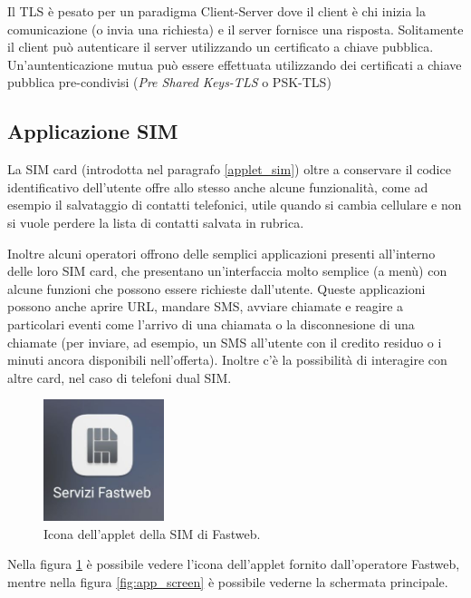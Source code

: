 Il TLS è pesato per un paradigma Client-Server dove il client è chi inizia la comunicazione (o invia una richiesta) e il server fornisce una risposta. Solitamente il client può autenticare il server utilizzando un certificato a chiave pubblica. Un'auntenticazione mutua può essere effettuata utilizzando dei certificati a chiave pubblica pre-condivisi (\textit{Pre Shared Keys-TLS} o PSK-TLS)
\cite{scwebserver}

\subsection{Applicazione SIM}
La SIM card (introdotta nel paragrafo \ref{applet_sim}) oltre a conservare il codice identificativo dell'utente offre allo stesso anche alcune funzionalità, come ad esempio il salvataggio di contatti telefonici, utile quando si cambia cellulare e non si vuole perdere la lista di contatti salvata in rubrica.

Inoltre alcuni operatori offrono delle semplici applicazioni presenti all'interno delle loro SIM card, che presentano un'interfaccia molto semplice (a menù) con alcune funzioni che possono essere richieste dall'utente. Queste applicazioni possono anche aprire URL, mandare SMS, avviare chiamate e reagire a particolari eventi come l'arrivo di una chiamata o la disconnesione di una chiamate (per inviare, ad esempio, un SMS all'utente con il credito residuo o i minuti ancora disponibili nell'offerta). Inoltre c'è la possibilità di interagire con altre card, nel caso di telefoni dual SIM.

\begin{figure}[h!]
  \centering
  \includegraphics[width=100pt]{pictures/icona_aplet_fastweb.jpg}
  \caption{Icona dell'applet della SIM di Fastweb.}
  \label{fig:app_icon}
\end{figure}

Nella figura \ref{fig:app_icon} è possibile vedere l'icona dell'applet fornito dall'operatore Fastweb, mentre nella figura \ref{fig:app_screen} è possibile vederne la schermata principale.

